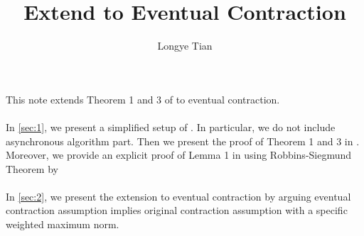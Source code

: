 \documentclass[a4paper]{article}
\title{Extend \cite{tsitsiklis1994asynchronous} to Eventual Contraction}
\author{Longye Tian}
\begin{document}
\maketitle
This note extends Theorem 1 and 3 of \cite{tsitsiklis1994asynchronous} to eventual contraction.\\
\\
\indent In \autoref{sec:1}, we present a simplified setup of \cite{tsitsiklis1994asynchronous}. In particular, we do not include asynchronous algorithm part. Then we present the proof of Theorem 1 and 3 in \cite{tsitsiklis1994asynchronous}. Moreover, we provide an explicit proof of Lemma 1 in \cite{tsitsiklis1994asynchronous} using Robbins-Siegmund Theorem by \cite{robbins1971convergence}\\
\\
\indent In \autoref{sec:2}, we present the extension to eventual contraction by arguing eventual contraction assumption implies original contraction assumption with a specific weighted maximum norm.
\tableofcontents
\newpage





\newpage

\printbibliography{}
\newpage

\appendix
\appendixpage{}

\end{document}
